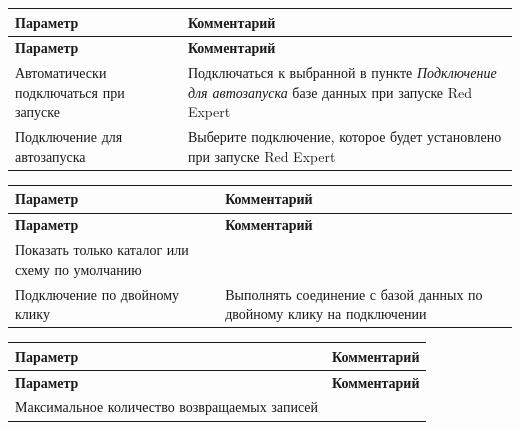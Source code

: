 
\begin{longtable}[r]{|>{\ttfamily}m{5cm}|m{10.5cm}|}
	\hline
	\centering\normalfont\bfseries Параметр &
	\centering\arraybslash\bfseries Комментарий\\\hline
	\endfirsthead
	\hline
	\centering\normalfont\bfseries Параметр &
	\centering\arraybslash\bfseries Комментарий\\\hline
	\endhead
	\hline
	Автоматически подключаться при запуске & Подключаться к выбранной в пункте \textit{Подключение для автозапуска} базе данных при запуске Red Expert\\\hline
	Подключение для автозапуска &  Выберите подключение, которое будет установлено при запуске Red Expert\\\hline
\end{longtable}



\begin{longtable}[r]{|>{\ttfamily}m{5cm}|m{10.5cm}|}
	\hline
	\centering\normalfont\bfseries Параметр &
	\centering\arraybslash\bfseries Комментарий\\\hline
	\endfirsthead
	\centering\normalfont\bfseries Параметр &
	\centering\arraybslash\bfseries Комментарий\\\hline
	\endhead
	Показать только каталог или схему по умолчанию & \\\hline
	Подключение по двойному клику & Выполнять соединение с базой данных по двойному клику на подключении \\\hline
\end{longtable}


\begin{longtable}[r]{|>{\ttfamily}m{5cm}|m{10.5cm}|}
	\hline
	\centering\normalfont\bfseries Параметр &
	\centering\arraybslash\bfseries Комментарий\\\hline
	\endfirsthead
	\centering\normalfont\bfseries Параметр &
	\centering\arraybslash\bfseries Комментарий\\\hline
	\endhead
	Максимальное количество возвращаемых записей  &  \\\hline
\end{longtable}


